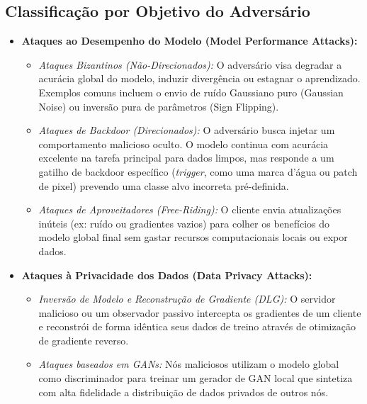 \documentclass[11pt,a4paper]{article}
\begin{document}
\subsection{Classificação por Objetivo do Adversário}
\begin{itemize}
\item \textbf{Ataques ao Desempenho do Modelo (Model Performance Attacks):}
    \begin{itemize}
    \item \textit{Ataques Bizantinos (Não-Direcionados):} O adversário visa degradar a acurácia global do modelo, induzir divergência ou estagnar o aprendizado. Exemplos comuns incluem o envio de ruído Gaussiano puro (Gaussian Noise) ou inversão pura de parâmetros (Sign Flipping).
    \item \textit{Ataques de Backdoor (Direcionados):} O adversário busca injetar um comportamento malicioso oculto. O modelo continua com acurácia excelente na tarefa principal para dados limpos, mas responde a um gatilho de backdoor específico (\textit{trigger}, como uma marca d'água ou patch de pixel) prevendo uma classe alvo incorreta pré-definida.
    \item \textit{Ataques de Aproveitadores (Free-Riding):} O cliente envia atualizações inúteis (ex: ruído ou gradientes vazios) para colher os benefícios do modelo global final sem gastar recursos computacionais locais ou expor dados.
    \end{itemize}
\item \textbf{Ataques à Privacidade dos Dados (Data Privacy Attacks):}
    \begin{itemize}
    \item \textit{Inversão de Modelo e Reconstrução de Gradiente (DLG):} O servidor malicioso ou um observador passivo intercepta os gradientes de um cliente e reconstrói de forma idêntica seus dados de treino através de otimização de gradiente reverso.
    \item \textit{Ataques baseados em GANs:} Nós maliciosos utilizam o modelo global como discriminador para treinar um gerador de GAN local que sintetiza com alta fidelidade a distribuição de dados privados de outros nós.
    \end{itemize}
\end{itemize}
\end{document}
